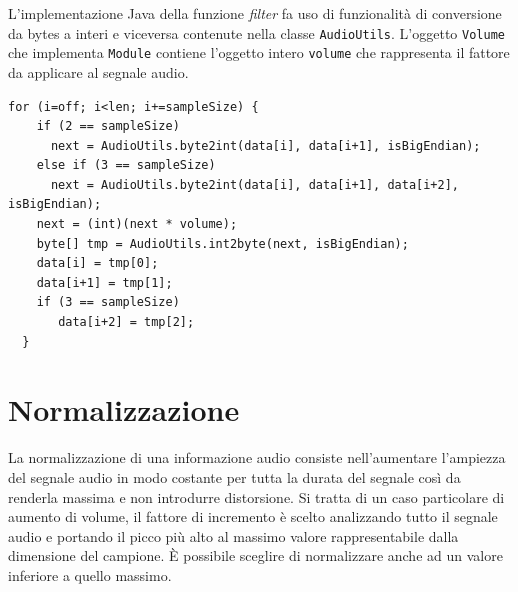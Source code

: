 \documentclass[a4papper]{article}
\begin{document}
L'implementazione Java della funzione \emph{filter} fa uso di
funzionalit\`a di conversione da bytes a interi e viceversa contenute
nella classe \verb+AudioUtils+. L'oggetto \verb+Volume+ che implementa
\verb+Module+ contiene l'oggetto intero \verb+volume+ che rappresenta
il fattore da applicare al segnale audio.
\begin{lstlisting}[caption={La parte rilevante dell'implementazione della funzione filter della classe Volume}]
  for (i=off; i<len; i+=sampleSize) {
    if (2 == sampleSize) 
      next = AudioUtils.byte2int(data[i], data[i+1], isBigEndian);
    else if (3 == sampleSize)
      next = AudioUtils.byte2int(data[i], data[i+1], data[i+2], isBigEndian);
    next = (int)(next * volume);
    byte[] tmp = AudioUtils.int2byte(next, isBigEndian);
    data[i] = tmp[0];
    data[i+1] = tmp[1];
    if (3 == sampleSize) 
       data[i+2] = tmp[2];
  }
\end{lstlisting}

\section{Normalizzazione}
La normalizzazione di una informazione audio consiste nell'aumentare
l'ampiezza del segnale audio in modo costante per tutta la durata del
segnale cos\`i da renderla massima e non introdurre distorsione. Si
tratta di un caso particolare di aumento di volume, il fattore di
incremento \`e scelto analizzando tutto il segnale audio e portando il
picco pi\`u alto al massimo valore rappresentabile dalla dimensione
del campione. \`E possibile sceglire di normalizzare anche ad un
valore inferiore a quello massimo.
\end{document}
